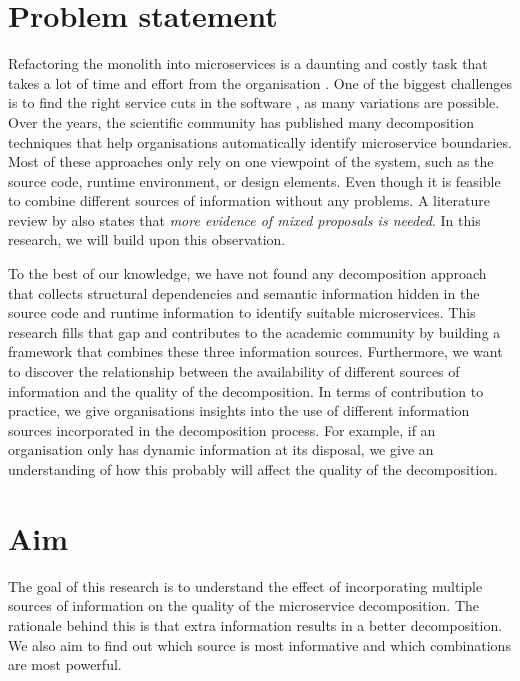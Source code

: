 \section{Problem statement}\label{s:problem}
Refactoring the monolith into microservices is a daunting and costly task that takes a lot of time and effort from the organisation \cite{kalske2017challenges}. One of the biggest challenges is to find the right service cuts in the software \cite{fritzsch2019microservices}, as many variations are possible. Over the years, the scientific community has published many decomposition techniques that help organisations automatically identify microservice boundaries. Most of these approaches only rely on one viewpoint of the system, such as the source code, runtime environment, or design elements. Even though it is feasible to combine different sources of information without any problems. A literature review by \citeauthor{ponce2019migrating} \cite{ponce2019migrating} also states that \textit{more evidence of mixed proposals is needed}. In this research, we will build upon this observation. \par
To the best of our knowledge, we have not found any decomposition approach that collects structural dependencies and semantic information hidden in the source code and runtime information to identify suitable microservices. This research fills that gap and contributes to the academic community by building a framework that combines these three information sources. Furthermore, we want to discover the relationship between the availability of different sources of information and the quality of the decomposition. 
In terms of contribution to practice, we give organisations insights into the use of different information sources incorporated in the decomposition process. For example, if an organisation only has dynamic information at its disposal, we give an understanding of how this probably will affect the quality of the decomposition.

\section{Aim}
The goal of this research is to understand the effect of incorporating multiple sources of information on the quality of the microservice decomposition. The rationale behind this is that extra information results in a better decomposition. We also aim to find out which source is most informative and which combinations are most powerful. 

